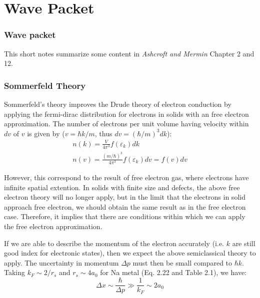 \documentclass{article}
\begin{document}
\part{Wave Packet}

\section{Wave packet}
This short notes summarize some content in \emph{Ashcroft and Mermin} Chapter 2 and 12.
\section{Sommerfeld Theory}

Sommerfeld's theory improves the Drude theory of electron conduction by applying the fermi-dirac 
distribution for electrons in solids with an free electron approximation. The number of 
electrons per unit volume having velocity within $dv$ of $v$ is given by 
($v = \hbar k/m$, thus $dv = (\hbar/m)^3 dk$):
\begin{gather}
    n(k) = \frac{V}{4\pi^3} f(\varepsilon_k) dk \\
    n(v) = \frac{(m/\hbar)^3}{4\pi^3} f(\varepsilon_k) dv = f(v) dv
\end{gather}

However, this correspond to the result of free electron gas, where electrons have infinite
spatial extention. In solids with finite size and defects, the above free electron theory
will no longer apply, but in the limit that the electrons in solid approach free electron, 
we should obtain the same result as in the free electron case. Therefore, it implies that 
there are conditions within which we can apply the free electron approximation. 

If we are able to describe the momentum of the electron accurately (i.e. $k$ are still good index
for electronic states), then we expect the above semiclassical theory to apply. 
The uncertainty in momentum $\Delta p$ must then be small compared to $\hbar k$. Taking $k_F \sim 2/r_s$
and $r_s \sim 4 a_0$ for Na metal (Eq. 2.22 and Table 2.1),
we have:
\begin{equation}
    \Delta x \sim \frac{\hbar}{\Delta p} \gg \frac{1}{k_F} \sim 2a_0
\end{equation}
\end{document}
